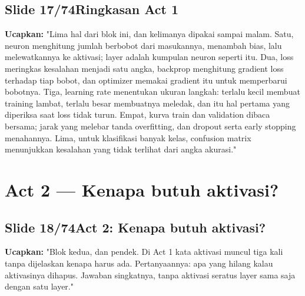 \documentclass[11pt]{article}
\renewcommand{\framebox}[1]{\colorbox{acc!15}{\textcolor{acc}{\textbf{#1}}}}
\begin{document}
\subsection*{\framebox{Slide 17/74}\quad Ringkasan Act 1}
\textbf{Ucapkan:} "Lima hal dari blok ini, dan kelimanya dipakai sampai malam. Satu, neuron menghitung jumlah berbobot dari masukannya, menambah bias, lalu melewatkannya ke aktivasi; layer adalah kumpulan neuron seperti itu. Dua, loss meringkas kesalahan menjadi satu angka, backprop menghitung gradient loss terhadap tiap bobot, dan optimizer memakai gradient itu untuk memperbarui bobotnya. Tiga, learning rate menentukan ukuran langkah: terlalu kecil membuat training lambat, terlalu besar membuatnya meledak, dan itu hal pertama yang diperiksa saat loss tidak turun. Empat, kurva train dan validation dibaca bersama; jarak yang melebar tanda overfitting, dan dropout serta early stopping menahannya. Lima, untuk klasifikasi banyak kelas, confusion matrix menunjukkan kesalahan yang tidak terlihat dari angka akurasi."\\[2pt]

\section{Act 2 — Kenapa butuh aktivasi?}

\subsection*{\framebox{Slide 18/74}\quad Act 2: Kenapa butuh aktivasi?}
\textbf{Ucapkan:} "Blok kedua, dan pendek. Di Act 1 kata aktivasi muncul tiga kali tanpa dijelaskan kenapa harus ada. Pertanyaannya: apa yang hilang kalau aktivasinya dihapus. Jawaban singkatnya, tanpa aktivasi seratus layer sama saja dengan satu layer."\\[2pt]
\end{document}
